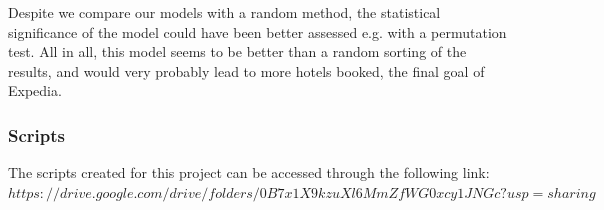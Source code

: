 \documentclass[9pt]{llncs}
\begin{document}
Despite we compare our models with a random method, the statistical significance of the model could have been better assessed e.g. with a permutation test.
All in all, this model seems to be better than a random sorting of the results, and would very probably lead to more hotels booked, the final goal of Expedia.


\subsubsection{Scripts} 
The scripts created for this project can be accessed through the following link:
\href{link)}{$https://drive.google.com/drive/folders/0B7x1X9kzuXl6MmZfWG0xcy1JNGc?usp=sharing$}




\end{document}
